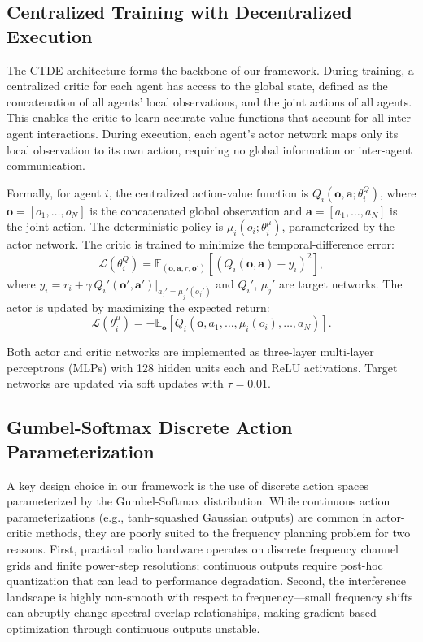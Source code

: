 \documentclass[conference]{IEEEtran}
\begin{document}
\subsection{Centralized Training with Decentralized Execution}

The CTDE architecture forms the backbone of our framework. During training, a centralized critic for each agent has access to the global state, defined as the concatenation of all agents' local observations, and the joint actions of all agents. This enables the critic to learn accurate value functions that account for all inter-agent interactions. During execution, each agent's actor network maps only its local observation to its own action, requiring no global information or inter-agent communication.

Formally, for agent $i$, the centralized action-value function is $Q_i(\mathbf{o}, \mathbf{a}; \theta_i^Q)$, where $\mathbf{o} = [o_1, \ldots, o_N]$ is the concatenated global observation and $\mathbf{a} = [a_1, \ldots, a_N]$ is the joint action. The deterministic policy is $\mu_i(o_i; \theta_i^\mu)$, parameterized by the actor network. The critic is trained to minimize the temporal-difference error:
\begin{equation}
\mathcal{L}(\theta_i^Q) = \mathbb{E}_{(\mathbf{o}, \mathbf{a}, r, \mathbf{o}')}\left[ \left( Q_i(\mathbf{o}, \mathbf{a}) - y_i \right)^2 \right],
\label{eq:critic_loss}
\end{equation}
where $y_i = r_i + \gamma \, Q_i'(\mathbf{o}', \mathbf{a}')|_{a_j' = \mu_j'(o_j')}$ and $Q_i'$, $\mu_j'$ are target networks. The actor is updated by maximizing the expected return:
\begin{equation}
\mathcal{L}(\theta_i^\mu) = -\mathbb{E}_{\mathbf{o}}\left[ Q_i(\mathbf{o}, a_1, \ldots, \mu_i(o_i), \ldots, a_N) \right].
\label{eq:actor_loss}
\end{equation}

Both actor and critic networks are implemented as three-layer multi-layer perceptrons (MLPs) with 128 hidden units each and ReLU activations. Target networks are updated via soft updates with $\tau = 0.01$.

\subsection{Gumbel-Softmax Discrete Action Parameterization}

A key design choice in our framework is the use of discrete action spaces parameterized by the Gumbel-Softmax distribution. While continuous action parameterizations (e.g., tanh-squashed Gaussian outputs) are common in actor-critic methods, they are poorly suited to the frequency planning problem for two reasons. First, practical radio hardware operates on discrete frequency channel grids and finite power-step resolutions; continuous outputs require post-hoc quantization that can lead to performance degradation. Second, the interference landscape is highly non-smooth with respect to frequency---small frequency shifts can abruptly change spectral overlap relationships, making gradient-based optimization through continuous outputs unstable.
\end{document}
